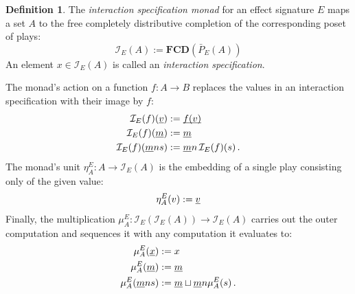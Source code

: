 \documentclass[11pt,oneside,draft]{book}
\theoremstyle{definition}
\newtheorem{definition}[theorem]{Definition}
\newcommand{\ul}[1]{%
  \underline{\smash{#1}}
}
\begin{document}
\begin{definition} \label{def:intm} %
The \emph{interaction specification monad}
for an effect signature $E$
maps a set $A$
to the free completely distributive completion
of the corresponding poset of plays:
\[
    \mathcal{I}_E(A) :=
      \mathbf{FCD}(\bar{P}_E(A))
\]
An element $x \in \mathcal{I}_E(A)$ is called
an \emph{interaction specification}.

The monad's action on a function $f : A \rightarrow B$
replaces the values in
an interaction specification with their image by $f$:
\begin{align*}
  \mathcal{I}_E(f)(\ul{v}) &:= \ul{f(v)} \\
  \mathcal{I}_E(f)(\ul{m}) &:= \ul{m} \\
  \mathcal{I}_E(f)(\ul{m} n s) &:=
    \ul{m} n \, \mathcal{I}_E(f)(s) \,.
\end{align*}
The monad's unit
$\eta^E_A : A \rightarrow \mathcal{I}_E(A)$
is the embedding of a single play
consisting only of the given value:
\[
    \eta^E_A(v) := \ul{v}
\]
Finally, the multiplication
$\mu^E_A : \mathcal{I}_E(\mathcal{I}_E(A)) \rightarrow \mathcal{I}_E(A)$
carries out the outer computation and
sequences it with any computation it evaluates to:
\begin{align*}
  \mu^E_A(\ul{x}) &:= x \\
  \mu^E_A(\ul{m}) &:= \ul{m} \\
  \mu^E_A(\ul{m} n s) &:=
    \ul{m} \sqcup \ul{m} n \mu^E_A(s) \,.
\end{align*}
\end{definition}

%
\end{document}
